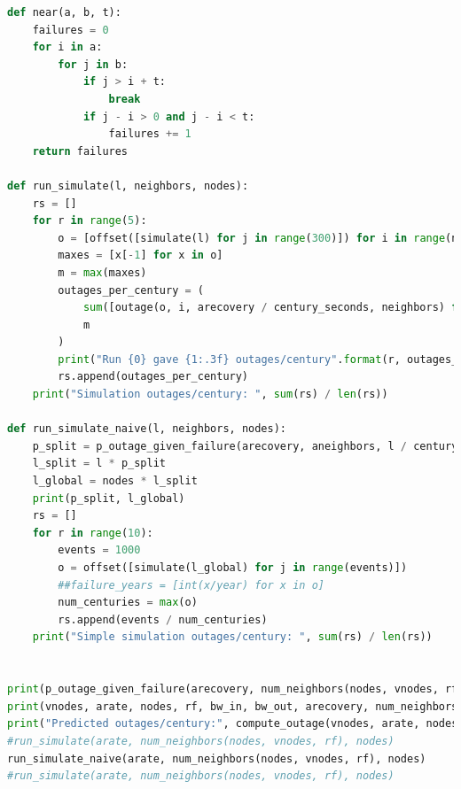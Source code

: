 \documentclass{article}
\begin{document}
\begin{lstlisting}[language=Python]
def near(a, b, t):
    failures = 0
    for i in a:
        for j in b:
            if j > i + t:
                break
            if j - i > 0 and j - i < t:
                failures += 1
    return failures

def run_simulate(l, neighbors, nodes):
    rs = []
    for r in range(5):
        o = [offset([simulate(l) for j in range(300)]) for i in range(nodes)]
        maxes = [x[-1] for x in o]
        m = max(maxes)
        outages_per_century = (
            sum([outage(o, i, arecovery / century_seconds, neighbors) for i in range(nodes)]) /
            m
        )
        print("Run {0} gave {1:.3f} outages/century".format(r, outages_per_century))
        rs.append(outages_per_century)
    print("Simulation outages/century: ", sum(rs) / len(rs))

def run_simulate_naive(l, neighbors, nodes):
    p_split = p_outage_given_failure(arecovery, aneighbors, l / century_seconds)
    l_split = l * p_split
    l_global = nodes * l_split
    print(p_split, l_global)
    rs = []
    for r in range(10):
        events = 1000
        o = offset([simulate(l_global) for j in range(events)])
        ##failure_years = [int(x/year) for x in o]
        num_centuries = max(o)
        rs.append(events / num_centuries)
    print("Simple simulation outages/century: ", sum(rs) / len(rs))


print(p_outage_given_failure(arecovery, num_neighbors(nodes, vnodes, rf), arate))
print(vnodes, arate, nodes, rf, bw_in, bw_out, arecovery, num_neighbors(nodes, vnodes, rf))
print("Predicted outages/century:", compute_outage(vnodes, arate, nodes, rf, bw_in, bw_out))
#run_simulate(arate, num_neighbors(nodes, vnodes, rf), nodes)
run_simulate_naive(arate, num_neighbors(nodes, vnodes, rf), nodes)
#run_simulate(arate, num_neighbors(nodes, vnodes, rf), nodes)
\end{lstlisting}
\end{document}
